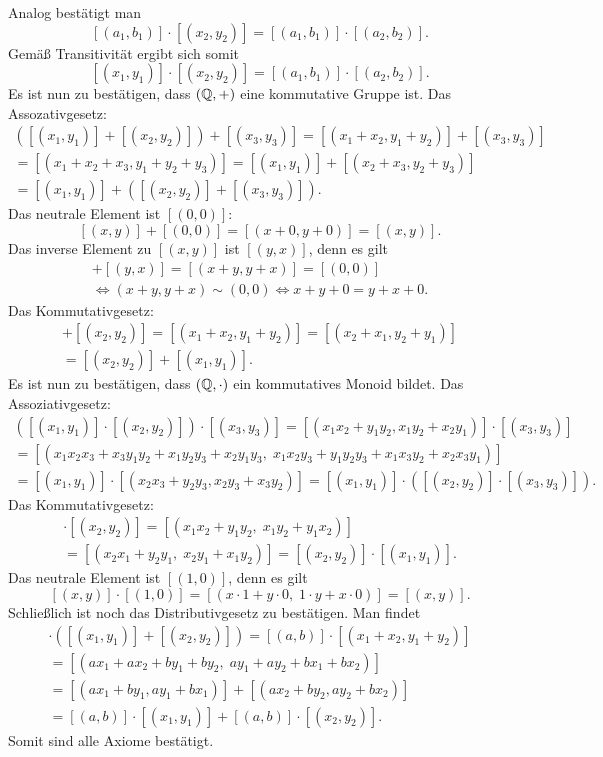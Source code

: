 Analog bestätigt man
\[[(a_1,b_1)]\cdot [(x_2,y_2)] = [(a_1,b_1)]\cdot [(a_2,b_2)].\]
Gemäß Transitivität ergibt sich somit
\[[(x_1,y_1)]\cdot [(x_2,y_2)] = [(a_1,b_1)]\cdot [(a_2,b_2)].\]
Es ist nun zu bestätigen, dass $(\mathbb Q,+)$ eine kommutative Gruppe ist.
Das Assozativgesetz:
\begin{gather*}
([(x_1,y_1)]+[(x_2,y_2)])+[(x_3,y_3)]
= [(x_1+x_2,y_1+y_2)] + [(x_3,y_3)]\\
= [(x_1+x_2+x_3,y_1+y_2+y_3)]
= [(x_1,y_1)]+[(x_2+x_3,y_2+y_3)]\\
= [(x_1,y_1)]+([(x_2,y_2)]+[(x_3,y_3)]).
\end{gather*}
Das neutrale Element ist $[(0,0)]$:
\[[(x,y)]+[(0,0)] = [(x+0,y+0)] = [(x,y)].\]
Das inverse Element zu $[(x,y)]$ ist $[(y,x)]$, denn es gilt
\begin{gather*}
[(x,y)]+[(y,x)] = [(x+y,y+x)] = [(0,0)]\\
\iff (x+y,y+x)\sim (0,0)\iff x+y+0 = y+x+0.
\end{gather*}
Das Kommutativgesetz:
\begin{gather*}
[(x_1,y_1)]+[(x_2,y_2)] = [(x_1+x_2,y_1+y_2)]
= [(x_2+x_1,y_2+y_1)]\\
= [(x_2,y_2)]+[(x_1,y_1)].
\end{gather*}
Es ist nun zu bestätigen, dass $(\mathbb Q,\cdot)$ ein kommutatives
Monoid bildet. Das Assoziativgesetz:
\begin{gather*}
([(x_1,y_1)]\cdot [(x_2,y_2)])\cdot [(x_3,y_3)]
= [(x_1x_2+y_1y_2,x_1y_2+x_2y_1)]\cdot [(x_3,y_3)]\\
= [(x_1x_2x_3+x_3y_1y_2+x_1y_2y_3+x_2y_1y_3,\;
x_1x_2y_3+y_1y_2y_3+x_1x_3y_2+x_2x_3y_1)]\\
= [(x_1,y_1)]\cdot [(x_2x_3+y_2y_3,x_2y_3+x_3y_2)]
= [(x_1,y_1)]\cdot ([(x_2,y_2)]\cdot [(x_3,y_3)]).
\end{gather*}
Das Kommutativgesetz:
\begin{gather*}
[(x_1,y_1)]\cdot [(x_2,y_2)] = [(x_1x_2+y_1y_2,\;x_1y_2+y_1x_2)]\\
= [(x_2x_1+y_2y_1,\;x_2y_1+x_1y_2)] = [(x_2,y_2)]\cdot [(x_1,y_1)].
\end{gather*}
Das neutrale Element ist $[(1,0)]$, denn es gilt
\[[(x,y)]\cdot [(1,0)] = [(x\cdot 1+y\cdot 0,\;1\cdot y+x\cdot 0)]
= [(x,y)].\]
Schließlich ist noch das Distributivgesetz zu bestätigen.
Man findet
\begin{gather*}
[(a,b)]\cdot ([(x_1,y_1)]+[(x_2,y_2)])
= [(a,b)]\cdot [(x_1+x_2,y_1+y_2)]\\
= [(ax_1+ax_2+by_1+by_2,\;ay_1+ay_2+bx_1+bx_2)]\\
= [(ax_1+by_1,ay_1+bx_1)]+[(ax_2+by_2,ay_2+bx_2)]\\
= [(a,b)]\cdot [(x_1,y_1)] + [(a,b)]\cdot [(x_2,y_2)].
\end{gather*}
Somit sind alle Axiome bestätigt.\;\qedsymbol

